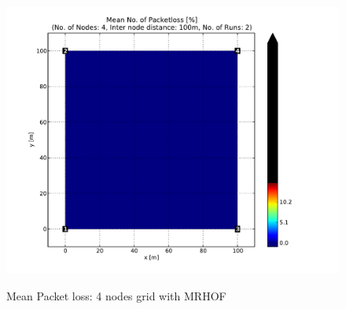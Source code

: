 \begin{figure}[htbp]
{      \hspace{-30pt}
      \includegraphics[scale=0.23]{Pics/results/4/MRHOF/grid/dist100_montecarlo_contour_packetloss.pdf}}
  \caption{Mean Packet loss: 4 nodes grid with MRHOF}
 \label{fig:pl_4_grid_mrhof}
\end{figure}
      

